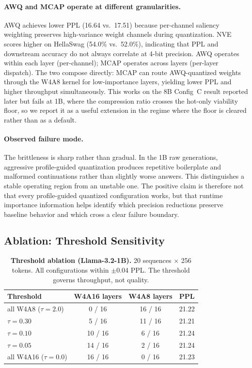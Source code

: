 \documentclass{article}
\begin{document}
\paragraph{AWQ and MCAP operate at different granularities.} AWQ
achieves lower PPL (16.64 vs.\ 17.51) because per-channel saliency
weighting preserves high-variance weight channels during quantization.
NVE scores higher on HellaSwag (54.0\% vs.\ 52.0\%), indicating that PPL
and downstream accuracy do not always correlate at 4-bit precision. AWQ
operates within each layer (per-channel); MCAP operates across layers
(per-layer dispatch). The two compose directly: MCAP can route
AWQ-quantized weights through the W4A8 kernel for low-importance layers,
yielding lower PPL and higher throughput simultaneously. This works on
the 8B Config~C result reported later but fails at 1B, where the
compression ratio crosses the hot-only viability floor, so we report it
as a useful extension in the regime where the floor is cleared rather
than as a default.

\paragraph{Observed failure mode.} The brittleness is sharp rather than
gradual. In the 1B raw generations, aggressive profile-guided quantization
produces repetitive boilerplate and malformed continuations rather than
slightly worse answers. This distinguishes a stable operating region from an
unstable one. The positive claim is therefore not that every profile-guided
quantized configuration works, but that runtime importance information helps
identify which precision reductions preserve baseline behavior and which
cross a clear failure boundary.


\subsection{Ablation: Threshold Sensitivity}
\label{sec:threshold}

\begin{table}[H]
\centering
\caption{\textbf{Threshold ablation (Llama-3.2-1B).} 20 sequences $\times$ 256 tokens.
All configurations within $\pm$0.04 PPL. The threshold governs throughput, not quality.}
\label{tab:threshold}
\small
\begin{tabular}{lccc}
\toprule
Threshold & W4A16 layers & W4A8 layers & PPL \\
\midrule
all W4A8 ($\tau = 2.0$) & 0 / 16 & 16 / 16 & 21.22 \\
$\tau = 0.30$ & 5 / 16 & 11 / 16 & 21.21 \\
$\tau = 0.10$ & 10 / 16 & 6 / 16 & 21.24 \\
$\tau = 0.05$ & 14 / 16 & 2 / 16 & 21.24 \\
all W4A16 ($\tau = 0.0$) & 16 / 16 & 0 / 16 & 21.23 \\
\bottomrule
\end{tabular}
\end{table}
\end{document}

